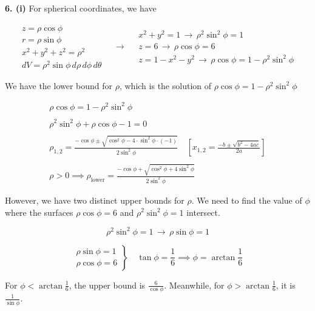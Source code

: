 \documentclass{article}
\begin{document}
\vspace{1em}

\textbf{6. (i)} For spherical coordinates, we have

\[
\begin{array}{c}
z=\rho\cos\phi\\
r=\rho\sin\phi\\
x^2+y^2+z^2=\rho^2\\
dV=\rho^2\sin\phi\,d\rho\,d\phi\,d\theta
\end{array}\quad\rightarrow\quad
\begin{array}{c}
x^2+y^2=1\,\rightarrow\,\rho^2\sin^2\phi = 1\\
z=6\,\rightarrow\,\rho\cos\phi=6\\
z=1-x^2-y^2\,\rightarrow\,\rho\cos\phi=1-\rho^2\sin^2\phi
\end{array}
\]

We have the lower bound for $\rho$, which is the solution of $\rho\cos\phi=1-\rho^2\sin^2\phi$

\[
\begin{array}{c}
\rho\cos\phi=1-\rho^2\sin^2\phi\\\\
\rho^2\sin^2\phi+\rho\cos\phi-1=0\\\\
\displaystyle \rho_{1,2} = \frac{-\cos\phi \pm\sqrt{\cos^2\phi-4\cdot\sin^2\phi\cdot(-1)}}{2\sin^2\phi}\quad\left[x_{1,2}=\frac{-b\pm\sqrt{b^2-4ac}}{2a}\right]\\\\
\displaystyle \rho>0\implies\rho_{\text{lower}}=\frac{-\cos\phi +\sqrt{\cos^2\phi+4\sin^2\phi}}{2\sin^2\phi}
\end{array}
\]

However, we have two distinct upper bounds for $\rho$. We need to find the value of $\phi$ where the surfaces $\rho\cos\phi = 6$ and $\rho^2\sin^2\phi=1$ intersect.

\[
\rho^2\sin^2\phi=1 \,\rightarrow\,\rho\sin\phi = 1
\]

\[
\left.
\begin{array}{c}
\rho\sin\phi=1\\
\rho\cos\phi=6
\end{array}
\right\}\quad\tan\phi=\frac16\implies\phi=\arctan{\frac16}
\]

For $\displaystyle\phi<\arctan\frac16$, the upper bound is $\displaystyle \frac6{\cos\phi}$. Meanwhile, for $\displaystyle\phi>\arctan\frac16$, it is $\displaystyle \frac1{\sin\phi}$.
\end{document}
